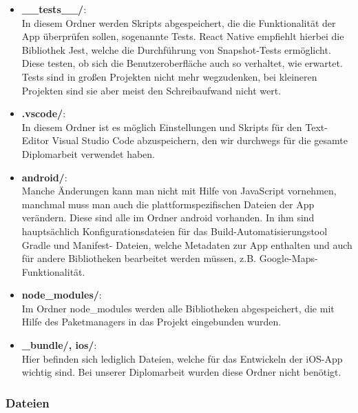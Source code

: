 \begin{itemize}
\item \textbf{\_\_tests\_\_/}:\\
In diesem Ordner werden Skripts abgespeichert, die die Funktionalität der App überprüfen sollen,
sogenannte Tests. React Native empfiehlt hierbei die Bibliothek Jest, welche die Durchführung von
Snapshot-Tests ermöglicht. Diese testen, ob sich die Benutzeroberfläche auch so verhaltet, wie
erwartet. Tests sind in großen Projekten nicht mehr wegzudenken, bei kleineren Projekten sind sie
aber meist den Schreibaufwand nicht wert.

\item \textbf{.vscode/}:\\
In diesem Ordner ist es möglich Einstellungen und Skripts für den Text-Editor Visual Studio Code
abzuspeichern, den wir durchwegs für die gesamte Diplomarbeit verwendet haben.

\item \textbf{android/}:\\
Manche Änderungen kann man nicht mit Hilfe von JavaScript vornehmen, manchmal muss man auch die
plattformspezifischen Dateien der App verändern. Diese sind alle im Ordner android vorhanden. In ihm
sind hauptsächlich Konfigurationsdateien für das Build-Automatisierungstool Gradle und Manifest-
Dateien, welche Metadaten zur App enthalten und auch für andere Bibliotheken bearbeitet werden
müssen, z.B. Google-Maps-Funktionalität.

\item \textbf{node\_modules/}:\\
Im Ordner node\_modules werden alle Bibliotheken abgespeichert, die mit Hilfe des Paketmanagers
in das Projekt eingebunden wurden.

\item \textbf{\_bundle/, ios/}:\\
Hier befinden sich lediglich Dateien, welche für das Entwickeln der iOS-App wichtig sind. Bei
unserer Diplomarbeit wurden diese Ordner nicht benötigt.

\end{itemize}

\newpage
\subsubsection{Dateien}

